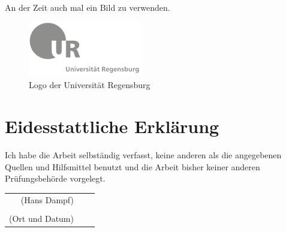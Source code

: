 \documentclass[12pt,ngerman,a4paper,DIV=9,headinclude=true,footinclude=false,titlepage=true,headsepline=true,toc=bibliography,toc=listof]{scrartcl}
\makeatletter
\newif \if@mainmatter \@mainmattertrue
\newcommand*\backmatter{\clearpage\thispagestyle{plain}\@mainmatterfalse}
\makeatother
\begin{document}


An der Zeit auch mal ein Bild zu verwenden.

\begin{figure}[htbp]
\centering
\includegraphics{Bilder/logo.png}
\caption{Logo der Universität Regensburg}
\end{figure}


\backmatter
\printbibheading[title={Quellen}]

\printbibliography[notkeyword=film,heading=subbibintoc,title={Literaturverzeichnis}]

\printbibliography[keyword=film,heading=subbibintoc,title={Filmverzeichnis}]


\clearpage
\thispagestyle{plain}
\markboth{}{}
\section*{Eidesstattliche Erklärung}


Ich habe die Arbeit selbständig verfasst, keine anderen als die angegebenen 
Quellen und Hilfsmittel benutzt und die Arbeit bisher keiner anderen
Prüfungsbehörde vorgelegt.

\vspace{1cm}

  \begin{center}
  \begin{tabular}{ r c l }
  (Hans Dampf)         &  & \dotfill                                     \\
                     &  & \parbox[t]{8cm}{\strut}                      \\
  (Ort und Datum)    &  & \dotfill                                     \\
  \end{tabular}
  \end{center}
\end{document}
